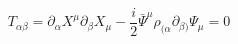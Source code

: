 \begin{equation}
T_{\alpha\beta}=\partial_{\alpha}X^{\mu }
\partial_{\beta}X_{\mu }- \frac{i}{2}\bar{\Psi}^{\mu}\rho_{(\alpha}\partial_{\beta )}
\Psi_{\mu}=0
\end{equation}

